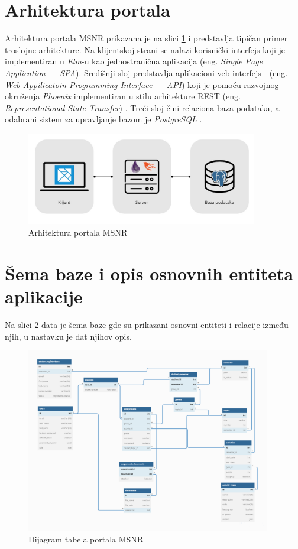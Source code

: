 \documentclass[12pt,oneside]{memoir}
\begin{document}
\section{Arhitektura portala}
Arhitektura portala MSNR prikazana je na slici \ref{fig:msnr-arch} i predstavlja tipičan primer troslojne arhitekture.
Na klijentskoj strani se nalazi korisnički interfejs koji je implementiran u \emph{Elm}-u kao jednostranična aplikacija (eng. \emph{Single Page Application --- SPA}).
Središnji sloj predstavlja aplikacioni veb interfejs - (eng. \emph{Web Appilicatoin Programming Interface --- API})
koji je pomoću razvojnog okruženja \emph{Phoenix} \cite{phoenix} implementiran u stilu arhitekture REST (eng. \emph{Representational State Transfer}) \cite{rest}.
Treći sloj čini relaciona baza podataka, a odabrani sistem za upravljanje bazom je \emph{PostgreSQL} \cite{psql} .
\begin{figure}[!ht]
  \centering
  \includegraphics[width=0.9\textwidth]{msnr-arch.png}
  \caption{Arhitektura portala MSNR}
  \label{fig:msnr-arch}
\end{figure}

\section{Šema baze i opis osnovnih entiteta aplikacije}
Na slici \ref{fig:msnr-db} data je šema baze gde su prikazani osnovni entiteti i relacije između njih, u nastavku je dat njihov opis.
\begin{figure}[!ht]
  \centering
  \includegraphics[width=0.95\textwidth]{msnr-db.png}
  \caption{Dijagram tabela portala MSNR}
  \label{fig:msnr-db}
\end{figure}
\end{document}
